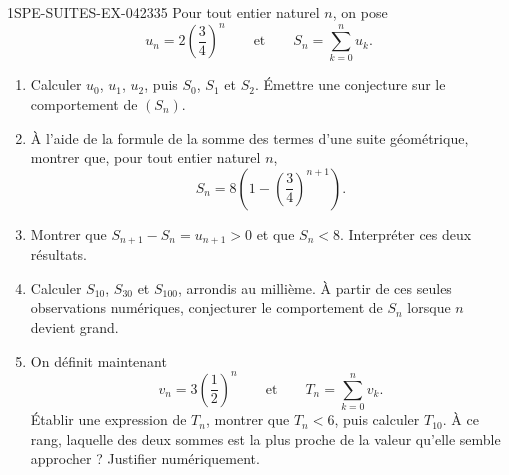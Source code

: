 \begin{exercice}{1SPE-SUITES-EX-042}{3}{35}
Pour tout entier naturel $n$, on pose
\[
u_n=2\left(\frac34\right)^n
\qquad\text{et}\qquad
S_n=\sum_{k=0}^{n}u_k.
\]

\begin{enumerate}
  \item Calculer $u_0$, $u_1$, $u_2$, puis $S_0$, $S_1$ et $S_2$.
  Émettre une conjecture sur le comportement de $(S_n)$.

  \item À l'aide de la formule de la somme des termes d'une suite géométrique,
  montrer que, pour tout entier naturel $n$,
  \[
  S_n=8\left(1-\left(\frac34\right)^{n+1}\right).
  \]

  \item Montrer que $S_{n+1}-S_n=u_{n+1}>0$ et que $S_n<8$.
  Interpréter ces deux résultats.

  \item Calculer $S_{10}$, $S_{30}$ et $S_{100}$, arrondis au millième.
  À partir de ces seules observations numériques, conjecturer le comportement
  de $S_n$ lorsque $n$ devient grand.

  \item On définit maintenant
  \[
  v_n=3\left(\frac12\right)^n
  \qquad\text{et}\qquad
  T_n=\sum_{k=0}^{n}v_k.
  \]
  Établir une expression de $T_n$, montrer que $T_n<6$, puis calculer $T_{10}$.
  À ce rang, laquelle des deux sommes est la plus proche de la valeur qu'elle
  semble approcher ? Justifier numériquement.
\end{enumerate}
\end{exercice}
